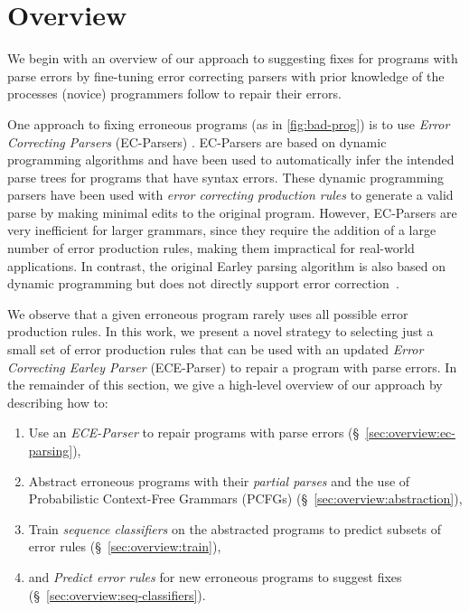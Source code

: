 \section{Overview}
\label{sec:overview}

We begin with an overview of our approach to suggesting fixes for programs with
parse errors by fine-tuning error correcting parsers with prior knowledge of the
processes (novice) programmers follow to repair their errors.

One approach to fixing erroneous programs (as in \autoref{fig:bad-prog})
is to use \emph{Error Correcting Parsers} (EC-Parsers) \citep{Aho_1972}.
EC-Parsers are based on dynamic programming algorithms and have been used
to automatically infer the intended parse trees for programs
that have syntax errors. These dynamic programming parsers have been used
with \emph{error correcting production rules} \citep{Aho_1972} to
generate a valid parse by making minimal edits to the original program.
However, EC-Parsers are very inefficient for larger
grammars, since they require the addition of a large number of error production
rules, making them impractical for real-world applications. In contrast, the
original Earley parsing algorithm is also based on dynamic programming
but does not directly support error correction~\citep{Earley_1970}.

We observe that a given erroneous program rarely uses all possible error
production rules.
In this work, we present a novel strategy to selecting just a small
set of error production rules that can be used with an updated \emph{Error
Correcting Earley Parser} (ECE-Parser) to repair a program with parse errors. In
the remainder of this section, we give a high-level overview of our approach by
describing how to:

\begin{enumerate}

  \item Use an \emph{ECE-Parser} to repair programs with parse errors
  (\S~\ref{sec:overview:ec-parsing}),

  \item Abstract erroneous programs with their \emph{partial parses} and the
  use of Probabilistic Context-Free Grammars (PCFGs)
  (\S~\ref{sec:overview:abstraction}),

  \item Train \emph{sequence classifiers} on the abstracted programs to predict
  subsets of error rules (\S~\ref{sec:overview:train}),

  \item and \emph{Predict error rules} for new erroneous programs to
  suggest fixes (\S~\ref{sec:overview:seq-classifiers}).

\end{enumerate}

